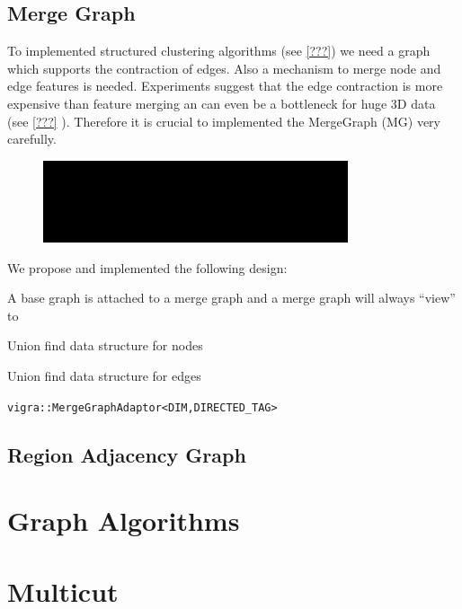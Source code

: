 \subsection{Merge Graph}
   To implemented structured clustering algorithms (see \cref{???}) we
   need a graph which supports the contraction of edges.
   Also a mechanism to merge node and edge features is needed.
   Experiments suggest that the edge contraction is more expensive
   than feature merging an can even be a bottleneck for huge 3D data 
   (see \cref{???} ).
   Therefore it is crucial to implemented the MergeGraph (MG) very carefully.


   \begin{figure}
   \includegraphics[width=0.8\textwidth]{uml/mergeGraph.png}
   \end{figure}

   We propose and implemented the following design:
   \begin{compactitem}
       \item  A base graph is attached to a merge graph  and  a merge graph will
            always ``view'' to
       \item  Union find data structure for nodes
       \item  Union find data structure for edges
   \end{compactitem}



   \lstinline{vigra::MergeGraphAdaptor<DIM,DIRECTED_TAG>}

\subsection{Region Adjacency Graph}


\section{Graph Algorithms}

    \section{Multicut}

